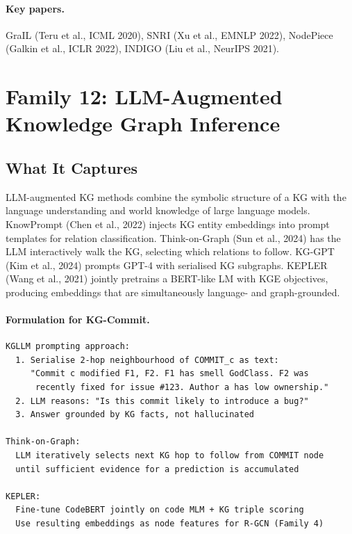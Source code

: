 \documentclass[12pt,a4paper]{article}
\begin{document}
\paragraph{Key papers.} GraIL (Teru et al., ICML 2020), SNRI (Xu et al.,
EMNLP 2022), NodePiece (Galkin et al., ICLR 2022), INDIGO (Liu et al.,
NeurIPS 2021).

\section{Family 12: LLM-Augmented Knowledge Graph Inference}

\subsection{What It Captures}

LLM-augmented KG methods combine the symbolic structure of a KG with the
language understanding and world knowledge of large language models.
KnowPrompt (Chen et al., 2022) injects KG entity embeddings into prompt
templates for relation classification. Think-on-Graph (Sun et al., 2024)
has the LLM interactively walk the KG, selecting which relations to follow.
KG-GPT (Kim et al., 2024) prompts GPT-4 with serialised KG subgraphs.
KEPLER (Wang et al., 2021) jointly pretrains a BERT-like LM with KGE
objectives, producing embeddings that are simultaneously language- and
graph-grounded.

\paragraph{Formulation for KG-Commit.}
\begin{lstlisting}
KGLLM prompting approach:
  1. Serialise 2-hop neighbourhood of COMMIT_c as text:
     "Commit c modified F1, F2. F1 has smell GodClass. F2 was
      recently fixed for issue #123. Author a has low ownership."
  2. LLM reasons: "Is this commit likely to introduce a bug?"
  3. Answer grounded by KG facts, not hallucinated

Think-on-Graph:
  LLM iteratively selects next KG hop to follow from COMMIT node
  until sufficient evidence for a prediction is accumulated

KEPLER:
  Fine-tune CodeBERT jointly on code MLM + KG triple scoring
  Use resulting embeddings as node features for R-GCN (Family 4)
\end{lstlisting}
\end{document}
